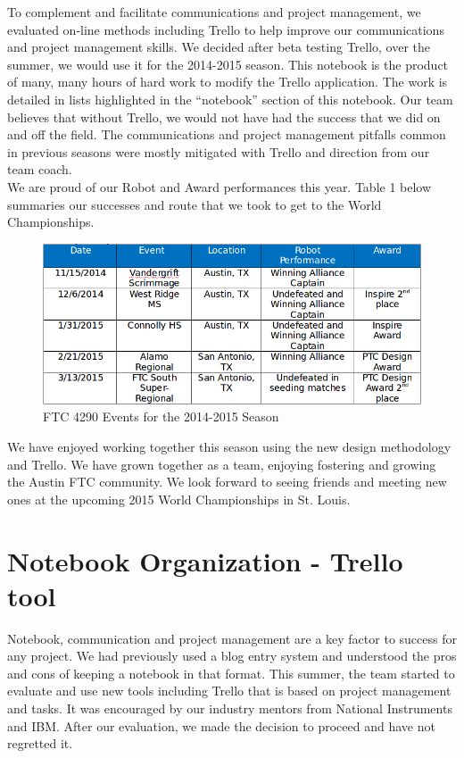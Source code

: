 To complement and facilitate communications and project management, we evaluated on-line methods including Trello to help improve our communications and project management skills. We decided after beta testing Trello, over the summer, we would use it for the 2014-2015 season.  This notebook is the product of many, many hours of hard work to modify the Trello application.  The work is detailed in lists highlighted in the “notebook” section of this notebook.  Our team believes that without Trello, we would not have had the success that we did on and off the field.  The communications and project management pitfalls common in previous seasons were mostly mitigated with Trello and direction from our team coach.\\

We are proud of our Robot and Award performances this year. Table 1 below summaries our successes and route that we took to get to the World Championships.\\

\begin{figure}[H]
	\centering
	\includegraphics[width=\linewidth]{events}
	\caption[]{FTC 4290 Events for the 2014-2015 Season}
	\label{fig:events}
\end{figure}


We have enjoyed working together this season using the new design methodology and Trello.  We have grown together as a team, enjoying fostering and growing the Austin FTC community.  We look forward to seeing friends and meeting new ones at the upcoming 2015 World Championships in St. Louis.\\

\newpage

\section{Notebook Organization - Trello tool}
Notebook, communication and project management are a key factor to success for any project. We had previously used a blog entry system and understood the pros and cons of keeping a notebook in that format.  This summer, the team started to evaluate and use new tools including Trello that is based on project management and tasks. It was encouraged by our industry mentors from National Instruments and IBM.  After our evaluation, we made the decision to proceed and have not regretted it.\\

